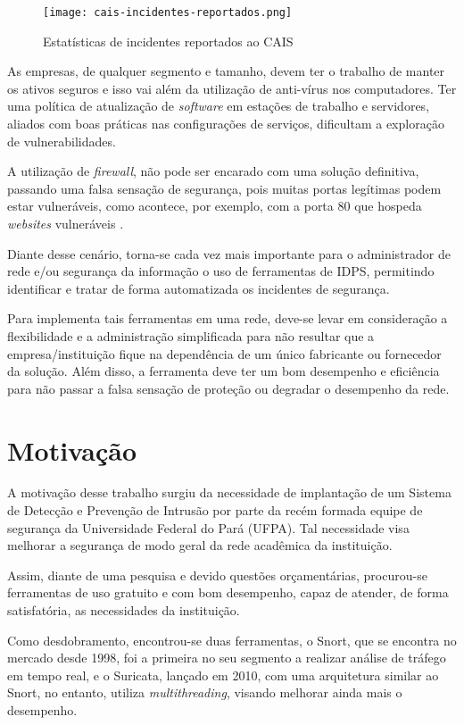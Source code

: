 \begin{figure}[!htb]
 \centering
 \caption{Estatísticas de incidentes reportados ao CAIS}
 \texttt{[image: cais-incidentes-reportados.png]}
 \label{fig:cais}
\end{figure}

As empresas, de qualquer segmento e tamanho, devem ter o trabalho de manter os ativos seguros e isso vai além da utilização de anti-vírus nos computadores. Ter uma política de atualização de \textit{software} em estações de trabalho e servidores, aliados com boas práticas nas configurações de serviços, dificultam a exploração de vulnerabilidades. 

A utilização de \textit{firewall}, não pode ser encarado com uma solução definitiva, passando uma falsa sensação de segurança, pois muitas portas legítimas podem estar vulneráveis, como acontece, por exemplo, com a porta 80 que hospeda \textit{websites} vulneráveis \cite{analisenessus:cleriston}.

Diante desse cenário, torna-se cada vez mais importante para o administrador de rede e/ou segurança da informação o uso de ferramentas de IDPS, permitindo identificar e tratar de forma automatizada os incidentes de segurança.

Para implementa tais ferramentas em uma rede, deve-se levar em consideração a flexibilidade e a administração simplificada para não resultar que a empresa/instituição fique na dependência de um único fabricante ou fornecedor da solução. Além disso, a ferramenta deve ter um bom desempenho e eficiência para não passar a falsa sensação de proteção ou degradar o desempenho da rede.

\section{Motivação} \label{sec:motivação} 

A motivação desse trabalho surgiu da necessidade de implantação de um Sistema de Detecção e Prevenção de Intrusão por parte da recém formada equipe de segurança da Universidade Federal do Pará (UFPA). Tal necessidade visa melhorar a segurança de modo geral da rede acadêmica da instituição. 

Assim, diante de uma pesquisa e devido questões orçamentárias, procurou-se ferramentas de uso gratuito e com bom desempenho, capaz de atender, de forma satisfatória, as necessidades da instituição. 

Como desdobramento, encontrou-se duas ferramentas, o Snort, que se encontra no mercado desde 1998, foi a primeira no seu segmento a realizar análise de tráfego em tempo real, e o Suricata, lançado em 2010, com uma arquitetura similar ao Snort, no entanto, utiliza \textit{multithreading}, visando melhorar ainda mais o desempenho.

